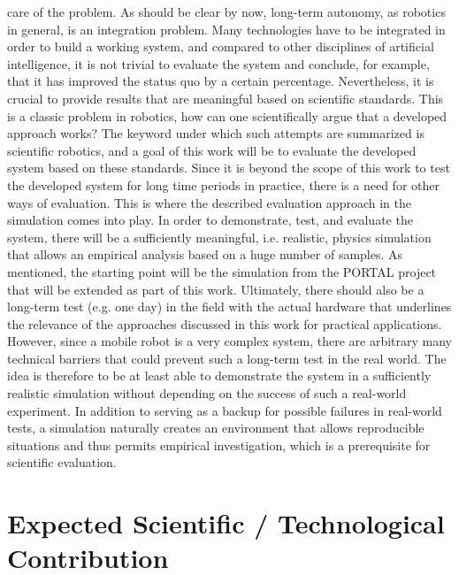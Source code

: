 \documentclass[english, master, expose, utf8]{base/thesis_KBS}
\begin{document}
care of the problem.\newline
As should be clear by now, long-term autonomy, as robotics in general, is an integration problem. Many technologies have to be integrated in order to build a working system, 
and compared to other disciplines of artificial intelligence, it is not trivial to evaluate the system and conclude, for example, that it has improved the status quo by a 
certain percentage. Nevertheless, it is crucial to provide results that are meaningful based on scientific standards. This is a classic problem in robotics, 
how can one scientifically argue that a developed approach works? The keyword under which such attempts are summarized is scientific robotics, 
and a goal of this work will be to evaluate the developed system based on these standards.
Since it is beyond the scope of this work to test the developed system for long time periods in practice, there is a need for other ways of evaluation.
This is where the described evaluation approach in the simulation comes into play. In order to demonstrate, test, and evaluate the system, there will be a sufficiently meaningful, 
i.e. realistic, physics simulation that allows an empirical analysis based on a huge number of samples. As mentioned, the starting point will be the simulation from the 
PORTAL project that will be extended as part of this work. Ultimately, there should also be a long-term test (e.g. one day) in the field with the actual hardware that 
underlines the relevance of the approaches discussed in this work for practical applications. However, since a mobile robot is a very complex system, there are arbitrary 
many technical barriers that could prevent such a long-term test in the real world. The idea is therefore to be at least able to demonstrate the system in a sufficiently 
realistic simulation without depending on the success of such a real-world experiment. In addition to serving as a backup for possible failures in real-world tests, 
a simulation naturally creates an environment that allows reproducible situations and thus permits empirical investigation, which is a prerequisite for scientific evaluation.

\section{Expected Scientific / Technological Contribution}
\end{document}
